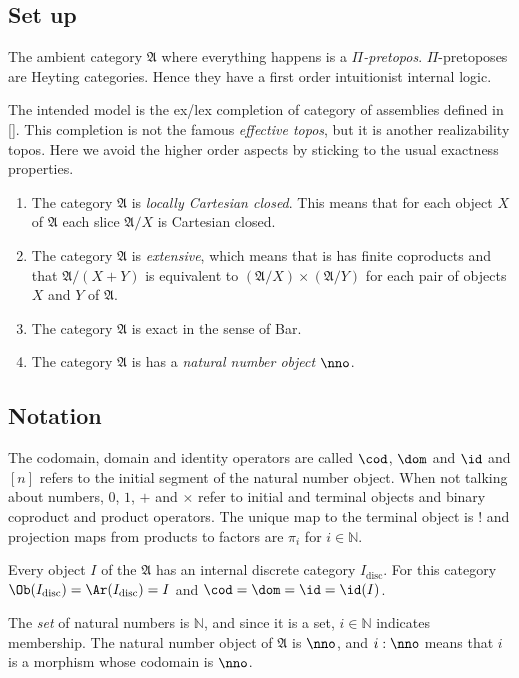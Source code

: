 \documentclass{tac}
\newcommand\N{\mathbb N}
\newcommand\disc{_{\mathrm{disc}}}
\newcommand\bang{!}
\newcommand\of{:}
\newcommand\citep[1]{[\cite{#1}]}
\newcommand\ambient{\mathfrak A}
\begin{document}
\subsection{Set up}
The ambient category $\ambient$ where everything happens is a \emph{$\Pi$-pretopos}. $\Pi$-pretoposes are Heyting categories. Hence they have a first order intuitionist internal logic.

The intended model is the ex/lex completion of category of assemblies defined in \citep{MR1097022,MR1023803,MR2479466}. This completion is not the famous \emph{effective topos}, but it is another realizability topos. Here we avoid the higher order aspects by sticking to the usual exactness properties.

\begin{enumerate}
\item The category $\ambient$ is \emph{locally Cartesian closed}. This means that for each object $X$ of $\ambient$ each slice $\ambient/X$ is Cartesian closed.
\item The category $\ambient$ is \emph{extensive}, which means that is has finite coproducts and that $\ambient/(X+Y)$ is equivalent to $(\ambient/X)\times(\ambient/Y)$ for each pair of objects $X$ and $Y$ of $\ambient$.
\item The category $\ambient$ is exact in the sense of Bar.
\item The category $\ambient$ is has a \emph{natural number object} $\nno$.
\end{enumerate}

\subsection{Notation} The codomain, domain and identity operators are called $\cod$, $\dom$ and $\id$ and $[n]$ refers to the initial segment of the natural number object. When not talking about numbers, $0$, $1$, $+$ and $\times$ refer to initial and terminal objects and binary coproduct and product operators. The unique map to the terminal object is $\bang$ and projection maps from products to factors are $\pi_i$ for $i\in \N$.

Every object $I$ of the $\ambient$ has an internal discrete category $I\disc$. For this category $\Ob(I\disc)=\Ar(I\disc)=I$ and $\cod=\dom=\id=\id(I)$.

The \emph{set} of natural numbers is $\N$, and since it is a set, $i\in \N$ indicates membership. The natural number object of $\ambient$ is $\nno$, and $i\of\nno$ means that $i$ is a morphism whose codomain is $\nno$.
\end{document}
